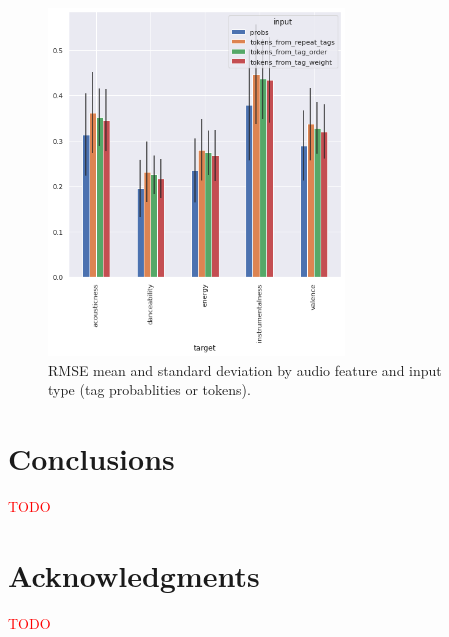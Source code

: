 \documentclass[sn-mathphys]{sn-jnl}%
\theoremstyle{thmstyleone}%
\theoremstyle{thmstyletwo}%
\theoremstyle{thmstylethree}%
\begin{document}
\begin{figure}[h!]
      \centering
      \includegraphics[width=0.7\textwidth]{images/rmse_by_feature_and_input.png}
      \caption{RMSE mean and standard deviation by audio feature and input type (tag probablities or tokens).}
      \label{fig:rmse_by_feature_and_input}
\end{figure}

\section{Conclusions}

\textcolor{red}{TODO}


\section{Acknowledgments}

\textcolor{red}{TODO}





\end{document}
